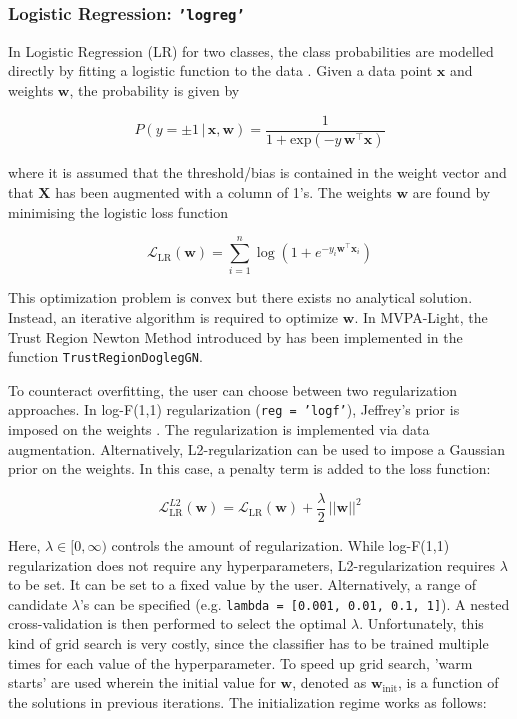 \documentclass[utf8]{frontiersSCNS} %
\newcommand{\w}{\mathbf{w}}
\newcommand{\x}{\mathbf{x}}
\renewcommand{\L}{\mathcal{L}}
\newcommand{\X}{\mathbf{X}}
\newcommand{\ttt}[1]{\texttt{#1}}
\begin{document}
\subsubsection{Logistic Regression: \ttt{'logreg'}}

In Logistic Regression (LR) for two classes, the class probabilities are modelled directly by fitting a logistic function to the data \citep{Hastie2009}. Given a data point $\x$ and weights $\w$, the probability is given by

\begin{equation}
\label{eq:logreg_probability}
P(y = \pm 1\,|\,\x,\w) = \frac{1}{1 + \text{exp}(-y\,\w^\top\x)}
\end{equation}

where it is assumed that the threshold/bias is contained in the weight vector and that $\X$ has been augmented with a column of 1's. The weights $\w$ are found by minimising the logistic loss function

\begin{equation}
\label{eq:logreg_loss_function}
\L_\text{LR}(\w) = \sum_{i=1}^n \log(1 + e^{-y_i\w^\top\x_i})
\end{equation}

This optimization problem is convex but there exists no analytical solution. Instead, an iterative algorithm is required to optimize $\w$. In MVPA-Light, the Trust Region Newton Method introduced by \cite{Lin2007TrustRegression} has been implemented in the function \ttt{TrustRegionDoglegGN}.

To counteract overfitting, the user can choose between two regularization approaches. In log-F(1,1) regularization (\ttt{reg = 'logf'}), Jeffrey's prior is imposed on the weights \citep{Firth1993BiasEstimates,Rahman2017PerformanceData.,King2001}. The regularization is implemented via data augmentation. Alternatively, L2-regularization can be used to impose a Gaussian prior on the weights. In this case, a penalty term is added to the loss function:

\begin{equation}
\label{eq:logreg_loss_function_plus_penalty}
\L_\text{LR}^{L2}(\w) = \L_\text{LR}(\w) + \frac{\lambda}{2}\, ||\w||^2
\end{equation}

Here, $\lambda\in [0,\infty)$ controls the amount of regularization. While log-F(1,1) regularization does not require any hyperparameters, L2-regularization requires $\lambda$ to be set. It can be set to a fixed value by the user. Alternatively, a range of candidate $\lambda$'s can be specified (e.g. \ttt{lambda = [0.001, 0.01, 0.1, 1]}). A nested cross-validation is then performed to select the optimal $\lambda$.
Unfortunately, this kind of grid search is very costly, since the classifier has to be trained multiple times for each value of the hyperparameter. To speed up grid search, 'warm starts' are used wherein the initial value for $\w$, denoted as  $\w_\text{init}$, is a function of the solutions in previous iterations. The initialization regime works as follows:
\end{document}
